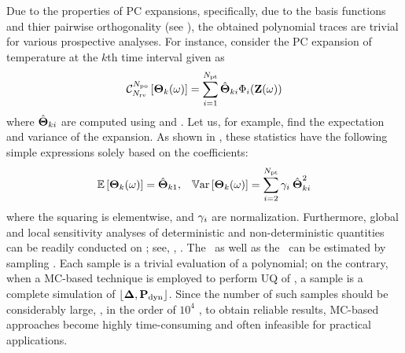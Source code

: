 Due to the properties of PC expansions, specifically, due to the basis functions and thier pairwise orthogonality (see ), the obtained polynomial traces are trivial for various prospective analyses. For instance, consider the PC expansion of temperature at the $k$th time interval given as
\begin{equation} \elabel{pc-k}
  \oPC{\vars}{\pcorder}{\vTO_k(\o)} = \sum_{i = 1}^{\pcterms} \pcc{\vTO}_{ki} \pcb_i(\vZ(\o))
\end{equation}
where $\hat{{\boldsymbol\Theta}}_{ki}$ are computed using  and . Let us, for example, find the expectation and variance of the expansion. As shown in , these statistics have the following simple expressions solely based on the coefficients:
\begin{align} \elabel{pc-moments}
  & \oExp{\vTO_k(\o)} = \pcc{\vTO}_{k1}, & \oVar{\vTO_k(\o)} = \sum_{i = 2}^{\pcterms} \pcn_i \: \pcc{\vTO}_{ki}^2
\end{align}
where the squaring is elementwise, and $\gamma_i$ are normalization. Furthermore, global and local sensitivity analyses of deterministic and non-deterministic quantities can be readily conducted on ; see, \eg, \cite{eldred2009, maitre2010}. The \cdf\ as well as the \pdf\ can be estimated by sampling . Each sample is a trivial evaluation of a polynomial; on the contrary, when a MC-based technique is employed to perform UQ of , a sample is a complete simulation of $\profPdyn$. Since the number of such samples should be considerably large, \eg, in the order of $10^4$ \cite{xiu2010, diaz-emparanza2002}, to obtain reliable results, MC-based approaches become highly time-consuming and often infeasible for practical applications.
